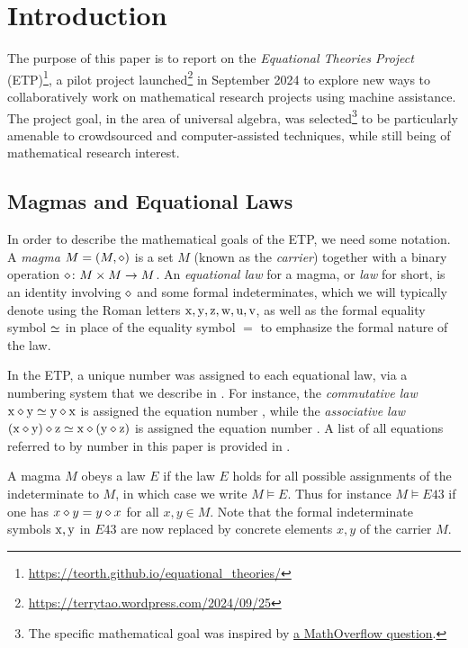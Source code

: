 \section{Introduction}

The purpose of this paper is to report on the \emph{Equational Theories Project} (ETP)\footnote{\url{https://teorth.github.io/equational_theories/}}, a pilot project launched\footnote{\url{https://terrytao.wordpress.com/2024/09/25}} in September 2024 to explore new ways to collaboratively work on mathematical research projects using machine assistance. The project goal, in the area of universal algebra, was selected\footnote{The specific mathematical goal was inspired by \href{https://mathoverflow.net/questions/450930}{a MathOverflow question}.} to be particularly amenable to crowdsourced and computer-assisted techniques, while still being of mathematical research interest. 

\subsection{Magmas and Equational Laws}

In order to describe the mathematical goals of the ETP, we need some notation. A \emph{magma} $M = (M,\diamond)$ is a set $M$ (known as the \emph{carrier}) together with a binary operation $\diamond \colon M \times M \to M$. An \emph{equational law} for a magma, or \emph{law} for short, is an identity involving $\diamond$ and some formal indeterminates, which we will typically denote using the Roman letters $\mathrm{x},\mathrm{y},\mathrm{z},\mathrm{w},\mathrm{u},\mathrm{v}$, as well as the formal equality symbol $\simeq$ in place of the equality symbol $=$ to emphasize the formal nature of the law.

In the ETP, a unique number was assigned to each equational law, via a numbering system that we describe in .  For instance, the \emph{commutative law} $\mathrm{x} \diamond \mathrm{y} \simeq \mathrm{y} \diamond \mathrm{x}$ is assigned the equation number , while the \emph{associative law} $(\mathrm{x} \diamond \mathrm{y}) \diamond \mathrm{z} \simeq \mathrm{x} \diamond (\mathrm{y} \diamond \mathrm{z})$ is assigned the equation number .  A list of all equations referred to by number in this paper is provided in .

A magma $M$ obeys a law $E$ if the law $E$ holds for all possible assignments of the indeterminate to $M$, in which case we write $M \models E$. Thus for instance $M \models E43$ if one has $x \diamond y = y \diamond x$ for all $x,y \in M$.  Note that the formal indeterminate symbols $\mathrm{x}, \mathrm{y}$ in $E43$ are now replaced by concrete elements $x,y$ of the carrier $M$.

